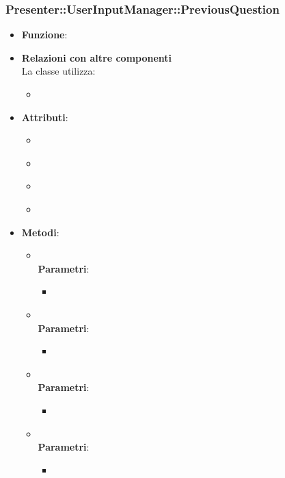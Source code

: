 \subsubsection{Presenter::UserInputManager::PreviousQuestion}
\begin{itemize}
\item\textbf{Funzione}:
\item\textbf{Relazioni con altre componenti}\\
La classe utilizza:
	\begin{itemize}
		\item
	\end{itemize}
\item\textbf{Attributi}:
	\begin{itemize}
		\item\code{}\\
		\item\code{}\\
		\item\code{}\\
		\item\code{}\\
	\end{itemize}
\item\textbf{Metodi}:
	\begin{itemize}
		\item\code{}\\
		\textbf{Parametri}:
			\begin{itemize}
				\item\code{}\\
			\end{itemize}
		\item\code{}\\
		\textbf{Parametri}:
			\begin{itemize}
				\item\code{}\\
			\end{itemize}
		\item\code{}\\
		\textbf{Parametri}:
			\begin{itemize}
				\item\code{}\\
			\end{itemize}
		\item\code{}\\
		\textbf{Parametri}:
			\begin{itemize}
				\item\code{}\\
			\end{itemize}
	\end{itemize}
\end{itemize}

